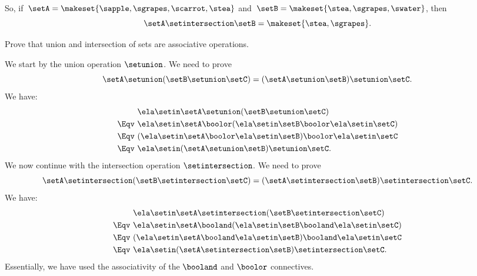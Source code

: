 So, if~$\setA = \makeset{ \sapple, \sgrapes, \scarrot, \stea }$ and~$\setB = \makeset{ \stea, \sgrapes, \swater }$, then
\begin{equation}
    \setA \setintersection \setB = \makeset{ \stea, \sgrapes }.
\end{equation}

\begin{exercise}
    Prove that union and intersection of sets are associative operations.
\end{exercise}

\begin{solution}
    We start by the union operation $\setunion$.
    We need to prove
    \begin{equation*}
        \setA \setunion (\setB \setunion \setC)= (\setA \setunion \setB) \setunion \setC.
    \end{equation*}
    We have:
    \begin{equation*}
        \begin{split}
                    & \ela \setin \setA \setunion (\setB \setunion \setC)                     \\
            \Eqv \  & \ela \setin \setA \boolor (\ela \setin \setB \boolor \ela \setin \setC) \\
            \Eqv \  & (\ela \setin \setA \boolor \ela \setin \setB)\boolor \ela \setin \setC  \\
            \Eqv \  & \ela \setin (\setA \setunion \setB) \setunion \setC.
        \end{split}
    \end{equation*}
    We now continue with the intersection operation $\setintersection$.
    We need to prove
    \begin{equation*}
        \setA \setintersection (\setB \setintersection \setC)= (\setA \setintersection \setB) \setintersection \setC.
    \end{equation*}
    We have:
    \begin{equation*}
        \begin{split}
                    & \ela \setin \setA \setintersection (\setB \setintersection \setC)         \\
            \Eqv \  & \ela \setin \setA \booland (\ela \setin \setB \booland \ela \setin \setC) \\
            \Eqv \  & (\ela \setin \setA \booland \ela \setin \setB)\booland \ela \setin \setC  \\
            \Eqv \  & \ela \setin (\setA \setintersection \setB) \setintersection \setC.
        \end{split}
    \end{equation*}
    Essentially, we have used the associativity of the $\booland$ and $\boolor$ connectives.
\end{solution}

